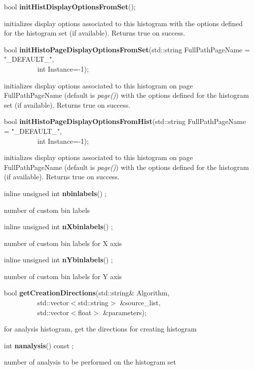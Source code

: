 \item    bool {\bf initHistDisplayOptionsFromSet}(); 


 initializes display options associated to this histogram with the
 options defined for the histogram set (if available). Returns true on
 success.


\item    bool {\bf initHistoPageDisplayOptionsFromSet}(std::string FullPathPageName = "\_DEFAULT\_",\\\mbox{}~~~~~~~~~
					  int Instance=-1);

 initializes display options associated to this histogram on page
 FullPathPageName (default is {\it page()}) with the
 options defined for the histogram set (if available). Returns true on
 success.


\item    bool {\bf initHistoPageDisplayOptionsFromHist}(std::string FullPathPageName = "\_DEFAULT\_",\\\mbox{}~~~~~~~~~
					   int Instance=-1);

 initializes display options associated to this histogram on page
 FullPathPageName (default is {\it page()}) with the
 options defined for the histogram (if available). Returns true on
 success.


\item    inline unsigned int {\bf nbinlabels}() ;

 number of custom bin labels


\item    inline unsigned int {\bf nXbinlabels}() ;

 number of custom bin labels for X axis


\item    inline unsigned int {\bf nYbinlabels}() ;

 number of custom bin labels for Y axis


\item    bool {\bf getCreationDirections}(std::string\& Algorithm,\\\mbox{}~~~~~~~~~
			     std::vector$<$std::string$>$ \&source\_list,\\\mbox{}~~~~~~~~~
			     std::vector$<$float$>$ \&parameters);

 for analysis histogram, get the directions for creating histogram


\item    int {\bf nanalysis}() const ;

 number of analysis to be performed on the histogram set



